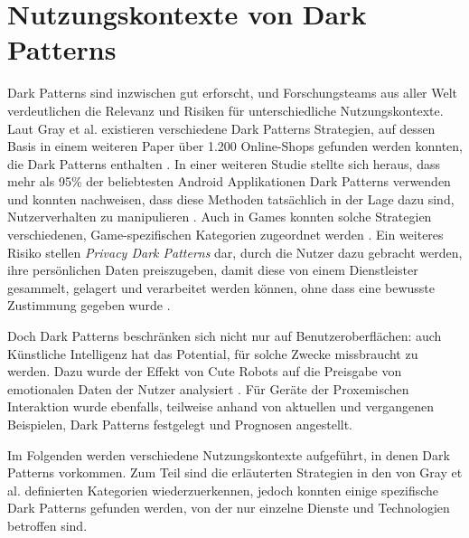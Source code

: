 \documentclass[a4paper]{article}
\begin{document}
\section{Nutzungskontexte von Dark Patterns} %
\label{sec:nutzungskontexte_von_dark_patterns}
Dark Patterns sind inzwischen gut erforscht, und Forschungsteams aus aller Welt verdeutlichen die Relevanz und Risiken für unterschiedliche Nutzungskontexte. Laut Gray et al. existieren verschiedene Dark Patterns Strategien, auf dessen Basis in einem weiteren Paper über 1.200 Online-Shops gefunden werden konnten, die Dark Patterns enthalten \cite{gray}\cite{mathur}. In einer weiteren Studie stellte sich heraus, dass mehr als 95\% der beliebtesten Android Applikationen Dark Patterns verwenden und konnten nachweisen, dass diese Methoden tatsächlich in der Lage dazu sind, Nutzerverhalten zu manipulieren \cite{geronimo}. Auch in Games konnten solche Strategien verschiedenen, Game-spezifischen Kategorien zugeordnet werden \cite{zagal}. Ein weiteres Risiko stellen \textit{Privacy Dark Patterns} dar, durch die Nutzer dazu gebracht werden, ihre persönlichen Daten preiszugeben, damit diese von einem Dienstleister gesammelt, gelagert und verarbeitet werden können, ohne dass eine bewusste Zustimmung gegeben wurde \cite{boesch}. 

Doch Dark Patterns beschränken sich nicht nur auf Benutzeroberflächen: auch Künstliche Intelligenz hat das Potential, für solche Zwecke missbraucht zu werden. Dazu wurde
der Effekt von \glqq Cute Robots\grqq{} auf die Preisgabe von emotionalen Daten der Nutzer analysiert \cite{lacey}. Für Geräte der Proxemischen Interaktion wurde ebenfalls, teilweise anhand von aktuellen und vergangenen Beispielen, Dark Patterns festgelegt und Prognosen angestellt.

Im Folgenden werden verschiedene Nutzungskontexte aufgeführt, in denen Dark Patterns vorkommen. Zum Teil sind die erläuterten Strategien in den von Gray et al. definierten Kategorien wiederzuerkennen, jedoch konnten einige spezifische Dark Patterns gefunden werden, von der nur einzelne Dienste und Technologien betroffen sind.
\end{document}
